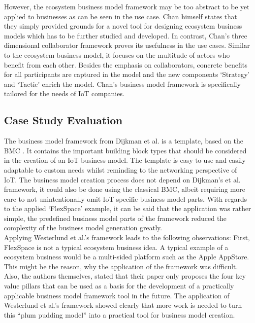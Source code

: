 		However, the ecosystem business model framework may be too abstract to be yet applied to businesses as can be seen in the use case. Chan himself states that they simply provided grounds for a novel tool for designing ecosystem business models which has to be further studied and developed. In contrast, Chan's three dimensional collaborator framework proves its usefulness in the use cases. Similar to the ecosystem business model, it focuses on the multitude of actors who benefit from each other. Besides the emphasis on collaborators, concrete benefits for all participants are captured in the model and the new components `Strategy' and `Tactic' enrich the model. Chan's business model framework is specifically tailored for the needs of IoT companies.
	\vspace{-2em}
	\subsection{Case Study Evaluation}
	\vspace{-1em}
		The business model framework from Dijkman et al. \cite{dijkman} is a template, based on the BMC \cite{bmc}. It contains the important building block types that should be considered in the creation of an IoT business model. The template is easy to use and easily adaptable to custom needs whilst reminding to the networking perspective of IoT. The business model creation process does not depend on Dijkman's et al. framework, it could also be done using the classical BMC, albeit requiring more care to not unintentionally omit IoT specific business model parts.
		With regards to the applied `FlexSpace' example, it can be said that the application was rather simple, the predefined business model parts of the framework reduced the complexity of the business model generation greatly.\\
		Applying Westerlund et al.'s framework leads to the following observations: First, FlexSpace is not a typical ecosystem business idea. A typical example of a ecosystem business would be a multi-sided platform such as the Apple AppStore. This might be the reason, why the application of the framework was difficult. Also, the authors themselves, stated that their paper only proposes the four key value pillars that can be used as a basis for the development of a practically applicable business model framework tool in the future. The application of Westerlund et al.'s framework showed clearly that more work is needed to turn this ``plum pudding model'' \cite{westerlund} into a practical tool for business model creation.\\
